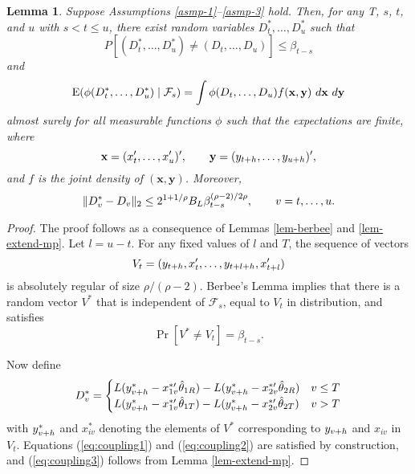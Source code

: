 \documentclass[11pt]{article}
\newtheorem{lem}{Lemma}
\begin{document}
\begin{lem}\label{lem-basic-coupling}
  Suppose Assumptions \ref{asmp-1}--\ref{asmp-3} hold.  Then, for any
  T, $s$, $t$, and $u$ with $s < t \leq u$, there exist random
  variables $D_t^*,\dots,D_u^*$ such that
  \begin{equation}\label{eq:coupling1}
    P[(D_{t}^*,\dots,D_u^*) \neq (D_{t},\dots,D_u)] \leq \beta_{t-s}
  \end{equation}
  and
  \begin{equation}\label{eq:coupling2}
    \E(\phi(D_{t}^*,\dots, D_u^*) \mid \mathcal{F}_s ) =
    \int
    \phi(D_{t},\dots,D_u) f(\mathbf{x}, \mathbf{y})\ d\mathbf{x}\ d\mathbf{y}
  \end{equation}
  almost surely for all measurable functions $\phi$ such that the
  expectations are finite, where
  \[ \mathbf{x} = (x_{t}', \dots, x_{u}')', \qquad
  \mathbf{y} = (y_{t+h},\dots,y_{u+h})',\] and $f$ is the
  joint density of $(\mathbf{x}, \mathbf{y})$.  Moreover,
 \begin{equation}\label{eq:coupling3}
   \| D_v^* - D_v \|_2 \leq 2^{1+1/\rho} B_L
   \beta_{t-s}^{(\rho-2)/2\rho}, \qquad v = t,\dots,u.
 \end{equation}
\end{lem}

\begin{proof}
  The proof follows as a consequence of Lemmas \ref{lem-berbee} and
  \ref{lem-extend-mp}.  Let $l = u-t$.  For any fixed values of $l$
  and $T$, the sequence of vectors
  \[ V_{t} = (y_{t+h}, x_{t}', \dots, y_{t+l+h}, x_{t+l}') \] is
  absolutely regular of size $\rho/(\rho-2)$.  Berbee's Lemma implies
  that there is a random vector $V^*$ that is independent of
  $\mathcal{F}_s$, equal to $V_{t}$ in distribution, and satisfies
  \[\Pr[V^* \neq V_{t}] = \beta_{t-s}.\]

  Now define
  \begin{equation*}
    D_v^* =
    \begin{cases}
      L(y_{v+h}^* - x_{1v}^{*\prime} \hat{\theta}_{1R}) - L(y_{v+h}^* -
      x_{2v}^{*\prime} \hat{\theta}_{2R}) & v \leq T \\
      L(y_{v+h}^* - x_{1v}^{*\prime} \hat{\theta}_{1T}) - L(y_{v+h}^* -
      x_{2v}^{*\prime} \hat{\theta}_{2T}) & v > T
    \end{cases}
  \end{equation*}
  with $y_{v+h}^*$ and $x_{iv}^*$ denoting the elements of $V^*$
  corresponding to $y_{v+h}$ and $x_{iv}$ in $V_{t}$.  Equations
  (\ref{eq:coupling1}) and (\ref{eq:coupling2}) are satisfied by
  construction, and (\ref{eq:coupling3}) follows from Lemma
  \ref{lem-extend-mp}.
\end{proof}
\end{document}
